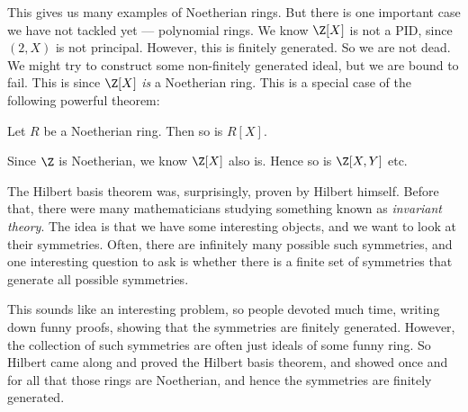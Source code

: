 \documentclass[a4paper]{article}
\begin{document}
This gives us many examples of Noetherian rings. But there is one important case we have not tackled yet --- polynomial rings. We know $\Z[X]$ is not a PID, since $(2, X)$ is not principal. However, this is finitely generated. So we are not dead. We might try to construct some non-finitely generated ideal, but we are bound to fail. This is since $\Z[X]$ \emph{is} a Noetherian ring. This is a special case of the following powerful theorem:

\begin{thm}
  Let $R$ be a Noetherian ring. Then so is $R[X]$.
\end{thm}
Since $\Z$ is Noetherian, we know $\Z[X]$ also is. Hence so is $\Z[X, Y]$ etc.

The Hilbert basis theorem was, surprisingly, proven by Hilbert himself. Before that, there were many mathematicians studying something known as \emph{invariant theory}. The idea is that we have some interesting objects, and we want to look at their symmetries. Often, there are infinitely many possible such symmetries, and one interesting question to ask is whether there is a finite set of symmetries that generate all possible symmetries.

This sounds like an interesting problem, so people devoted much time, writing down funny proofs, showing that the symmetries are finitely generated. However, the collection of such symmetries are often just ideals of some funny ring. So Hilbert came along and proved the Hilbert basis theorem, and showed once and for all that those rings are Noetherian, and hence the symmetries are finitely generated.
\end{document}
